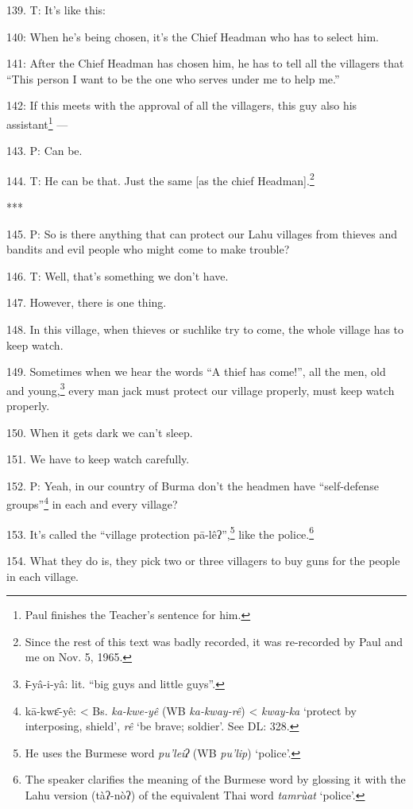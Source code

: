 139. T: It's like this:

140: When he's being chosen, it's the Chief Headman who has to select him.

141: After the Chief Headman has chosen him, he has to tell all the villagers that
``This person I want to be the one who serves under me to help me.''

142: If this meets with the approval of all the villagers, this guy also his assistant\footnote{Paul finishes the Teacher's sentence for him.}
---

143. P: Can be.

144. T: He can be that. Just the same [as the chief Headman].\footnote{Since the rest of this text was badly recorded, it was re-recorded by Paul and me on Nov. 5, 1965.}

***

145. P: So is there anything that can protect our Lahu villages from thieves and
bandits and evil people who might come to make trouble?

146. T: Well, that's something we don't have.

147. However, there is one thing.

148. In this village, when thieves or suchlike try to come, the whole village has
to keep watch.

149. Sometimes when we hear the words ``A thief has come!'', all the men, old and
young,\footnote{ɨ̄-yâ-i-yâ: lit. ``big guys and little guys''.}  every man jack must protect our village properly, must keep watch properly.

150. When it gets dark we can't sleep.

151. We have to keep watch carefully.

152. P: Yeah, in our country of Burma don't the headmen have ``self-defense groups''\footnote{kā-kwɛ̄-yê: < Bs. \textit{ka-kwe-yê }(WB \textit{ka-kway-rê}) < \textit{kway-ka} `protect by interposing, shield', \textit{rê }`be brave; soldier'. See DL: 328.}
in each and every village?

153. It's called the ``village protection pā-lêʔ'',\footnote{He uses the Burmese word \textit{pu'leiʔ }(WB \textit{pu'lip}) `police'.} like the police.\footnote{The speaker clarifies the meaning of the Burmese word by glossing it with the Lahu version (tàʔ-nòʔ) of the equivalent Thai word \textit{tamrùat }`police'.}

154. What they do is, they pick two or three villagers to buy guns for the people
in each village.

